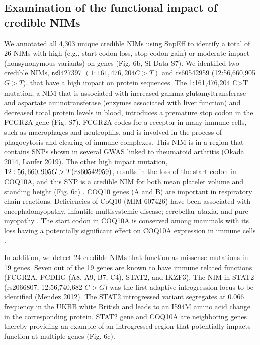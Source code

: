 \subsection{Examination of the functional impact of credible NIMs}
We annotated all 4,303 unique credible NIMs using SnpEff \cite{cingolani2012program} to identify a total of 26 NIMs with high (e.g., start codon loss, stop codon gain) or moderate impact (nonsynonymous variants) on genes (Fig. 6b, SI Data S7). We identified two credible NIMs, rs9427397 $(1:161,476,204 C>T)$ and rs60542959 (12:56,660,905 $G>T)$, that have a high impact on protein sequences. The 1:161,476,204 C>T mutation, a NIM that is associated with increased gamma glutamyltransferase and aspartate aminotransferase (enzymes associated with liver function) and decreased total protein levels in blood, introduces a premature stop codon in the FCGR2A gene (Fig. S7). FCGR2A codes for a receptor in many immune cells, such as macrophages and neutrophils, and is involved in the process of phagocytosis and clearing of immune complexes. This NIM is in a region that contains SNPs shown in several GWAS  linked to rheumatoid arthritis (Okada 2014, Laufer 2019). The other high impact mutation, $12:56,660,905\\ G>T (rs60542959)$, results in the loss of the start codon in COQ10A, and this SNP is a credible NIM for both mean platelet volume and standing height (Fig. 6c) . COQ10 genes (A and B) are important in respiratory chain reactions. Deficiencies of CoQ10 (MIM 607426) have been associated with encephalomyopathy, infantile multisystemic disease; cerebellar ataxia, and pure myopathy \cite{quinzii2008human}. The start codon in COQ10A is conserved among mammals with its loss having a potentially significant effect on COQ10A expression in immune cells \cite{kubota2020integrated}.

In addition, we detect 24 credible NIMs that function as missense mutations in 19 genes. Seven out of the 19 genes are known to have immune related functions (FCGR2A, PCDHG (A8, A9, B7, C4), STAT2, and IKZF3).  The NIM in STAT2 (rs2066807, 12:56,740,682 $C>G)$ was the first adaptive introgression locus to be identified (Mendez 2012). The STAT2 introgressed variant segregates at 0.066 frequency in the UKBB white British and leads to an I594M amino acid change in the corresponding protein. STAT2 gene and COQ10A are neighboring genes thereby providing an example of an introgressed region that potentially impacts function at multiple genes (Fig. 6c). 

